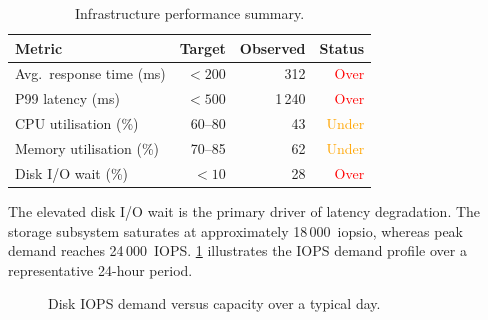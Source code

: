 \documentclass[
    language=english,
    doctype=technical-report,
    institution=none,
    titlestyle=book,
    oneside,
    loadGlossaries,
]{../../omnilatex}
\begin{document}
\begin{table}[htbp]
    \centering
    \caption{Infrastructure performance summary.\footnotemark}
    \label{tab:metrics}
    \begin{tabular}{@{}lrrr@{}}
        \toprule
        Metric & Target & Observed & Status \\
        \midrule
        Avg.\ response time (ms) & $< 200$ & 312 & \textcolor{red}{Over} \\
        P99 \gls{latency} (ms) & $< 500$ & 1\,240 & \textcolor{red}{Over} \\
        CPU utilisation (\%) & 60--80 & 43 & \textcolor{orange}{Under} \\
        Memory utilisation (\%) & 70--85 & 62 & \textcolor{orange}{Under} \\
        Disk I/O wait (\%) & $< 10$ & 28 & \textcolor{red}{Over} \\
        \bottomrule
    \end{tabular}
\end{table}
\addtocounter{footnote}{-1}

The elevated disk I/O wait is the primary driver of latency degradation.
The storage subsystem saturates at approximately 18\,000~\gls{iopsio},
whereas peak demand reaches 24\,000~IOPS. \cref{fig:iops-demand}
illustrates the IOPS demand profile over a representative 24-hour period.

\begin{figure}[htbp]
    \centering
    \caption{Disk IOPS demand versus capacity over a typical day.}
    \label{fig:iops-demand}
\end{figure}
\end{document}
